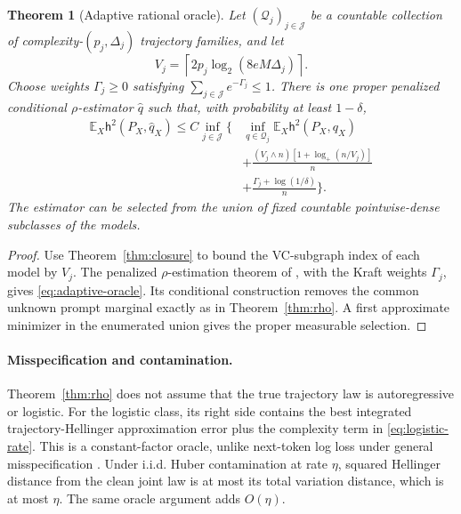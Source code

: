 \documentclass[twoside]{article}
\newtheorem{theorem}{Theorem}
\newcommand{\E}{\mathbb E}
\newcommand{\Q}{\mathcal Q}
\newcommand{\h}{\mathsf h}
\begin{document}
\begin{theorem}[Adaptive rational oracle]
\label{thm:adaptive}
Let $(\Q_j)_{j\in\mathcal J}$ be a countable collection of complexity-$(p_j,\Delta_j)$ trajectory families, and let \[ V_j=\left\lceil2p_j\log_2(8eM\Delta_j)\right\rceil. \] Choose weights $\Gamma_j\geq0$ satisfying $\sum_{j\in\mathcal J}e^{-\Gamma_j}\leq1$. There is one proper penalized conditional $\rho$-estimator $\widehat q$ such that, with probability at least $1-\delta$,
\begin{align}
 \E_X\h^2(P_X,\widehat q_X)
 \leq C\inf_{j\in\mathcal J}\bigg\{&\inf_{q\in\Q_j}\E_X\h^2(P_X,q_X)\nonumber\\
 &+\frac{(V_j\wedge n)[1+\log_+(n/V_j)]}{n}\nonumber\\
 &+\frac{\Gamma_j+\log(1/\delta)}{n}\bigg\}.
 \label{eq:adaptive-oracle}
\end{align}
The estimator can be selected from the union of fixed countable pointwise-dense subclasses of the models.
\end{theorem}

\begin{proof}
Use Theorem~\ref{thm:closure} to bound the VC-subgraph index of each model by $V_j$. The penalized $\rho$-estimation theorem of \citet{baraud2018}, with the Kraft weights $\Gamma_j$, gives \eqref{eq:adaptive-oracle}. Its conditional construction removes the common unknown prompt marginal exactly as in Theorem~\ref{thm:rho}. A first approximate minimizer in the enumerated union gives the proper measurable selection.
\end{proof}

\paragraph{Misspecification and contamination.} Theorem~\ref{thm:rho} does not assume that the true trajectory law is autoregressive or logistic. For the logistic class, its right side contains the best integrated trajectory-Hellinger approximation error plus the complexity term in \eqref{eq:logistic-rate}. This is a constant-factor oracle, unlike next-token log loss under general misspecification \citep{rohatgi2025}. Under i.i.d. Huber contamination at rate $\eta$, squared Hellinger distance from the clean joint law is at most its total variation distance, which is at most $\eta$. The same oracle argument adds $O(\eta)$.
\end{document}
